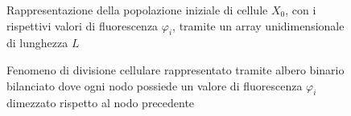 \begin{figure}[t]
    \centering
    \caption{Rappresentazione della popolazione iniziale di cellule $X_{0}$,
        con i rispettivi
        valori di fluorescenza $\varphi_{i}$, tramite un array unidimensionale
        di lunghezza $L$}
    \label{fig:population-array}
\end{figure}
\begin{figure}[t]
\centering
{}
\caption{Fenomeno di divisione cellulare rappresentato tramite albero
    binario bilanciato dove ogni nodo possiede un valore di fluorescenza
    $\varphi_{i}$ dimezzato rispetto al nodo precedente}
\label{fig:proliferation-tree}
\end{figure}
